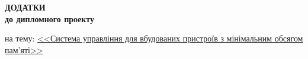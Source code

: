 \documentclass[oneside,14pt,a4paper,final]{myextreport}
\newenvironment{specialpage}{
  \clearpage
  \thispagestyle{empty}
  \enlargethispage{20mm}
  \singlespacing
  \begin{center}
}{
  \end{center}
  \clearpage
  \setcounter{page}{1}
  \thispagestyle{plain}
  \enlargethispage{-25mm}
}
\begin{document}
\enlargethispage{-25mm}









%



\begin{specialpage}
  \vspace*{\fill}

  \textbf{\large
  ДОДАТКИ\\
  до дипломного проекту
  }

  \vspace{10mm}
  на тему: \uline{<<Система управління для вбудованих пристроїв з мінімальним обсягом пам'яті>>}

  \vfill
\end{specialpage}


\end{document}
